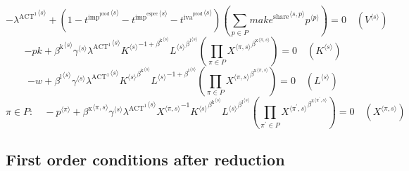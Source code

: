 \begin{equation}
-{\lambda^{\mathrm{ACT}^{\mathrm{1}}}}^{\langle s\rangle} + \left(1 - {t^{\mathrm{imp}^{\mathrm{prod}}}}^{\langle s\rangle} - {t^{\mathrm{imp}^{\mathrm{espec}}}}^{\langle s\rangle} - {t^{\mathrm{iva}^{\mathrm{prod}}}}^{\langle s\rangle}\right) \left(\sum_{p\in P} {{{m\!a\!k\!e}^{\mathrm{share}}}^{\langle s,p\rangle}} {{p}^{\langle p\rangle}}\right) = 0
 \quad \left({V}^{\langle s\rangle}\right)
\end{equation}
\begin{equation}
-{p\!k} + {{\beta^{\mathrm{k}}}^{\langle s\rangle}} {{\gamma}^{\langle s\rangle}} {{\lambda^{\mathrm{ACT}^{\mathrm{1}}}}^{\langle s\rangle}} {{{K}^{\langle s\rangle}}^{-1 + {\beta^{\mathrm{k}}}^{\langle s\rangle}}} {{{L}^{\langle s\rangle}}^{{\beta^{\mathrm{l}}}^{\langle s\rangle}}} \left(\prod_{\pi\in P} {{X}^{\langle \pi,s\rangle}}^{{\beta^{\mathrm{x}}}^{\langle \pi,s\rangle}}\right) = 0
 \quad \left({K}^{\langle s\rangle}\right)
\end{equation}
\begin{equation}
-w + {{\beta^{\mathrm{l}}}^{\langle s\rangle}} {{\gamma}^{\langle s\rangle}} {{\lambda^{\mathrm{ACT}^{\mathrm{1}}}}^{\langle s\rangle}} {{{K}^{\langle s\rangle}}^{{\beta^{\mathrm{k}}}^{\langle s\rangle}}} {{{L}^{\langle s\rangle}}^{-1 + {\beta^{\mathrm{l}}}^{\langle s\rangle}}} \left(\prod_{\pi\in P} {{X}^{\langle \pi,s\rangle}}^{{\beta^{\mathrm{x}}}^{\langle \pi,s\rangle}}\right) = 0
 \quad \left({L}^{\langle s\rangle}\right)
\end{equation}
\begin{equation}
\pi\in P\colon\quad -{p}^{\langle \pi\rangle} + {{\beta^{\mathrm{x}}}^{\langle \pi,s\rangle}} {{\gamma}^{\langle s\rangle}} {{\lambda^{\mathrm{ACT}^{\mathrm{1}}}}^{\langle s\rangle}} {{X}^{\langle \pi,s\rangle}}^{-1} {{{K}^{\langle s\rangle}}^{{\beta^{\mathrm{k}}}^{\langle s\rangle}}} {{{L}^{\langle s\rangle}}^{{\beta^{\mathrm{l}}}^{\langle s\rangle}}} \left(\prod_{\pi^{\prime}\in P} {{X}^{\langle \pi^{\prime},s\rangle}}^{{\beta^{\mathrm{x}}}^{\langle \pi^{\prime},s\rangle}}\right) = 0
 \quad \left({X}^{\langle \pi,s\rangle}\right)
\end{equation}


\subsection{First order conditions after reduction}

